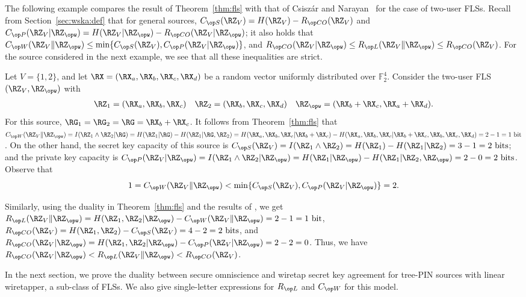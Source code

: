 The following example compares the result of Theorem~\ref{thm:fls} with that of Csisz\'ar and Narayan~\cite{csiszar04} for the case of  two-user FLSs. Recall from Section~\ref{sec:wska:def} that for general sources, $\skc(\RZ_V) = H(\RZ_V) - \rco(\RZ_V)$ and $\pkc(\RZ_V | \RZ_{\opw}) = H(\RZ_V|\RZ_{\opw}) - \rco(\RZ_V|\RZ_{\opw})$; it also holds that $\wskc(\RZ_V \| \RZ_{\opw}) \leq \min\{\skc(\RZ_V),\pkc(\RZ_V | \RZ_{\opw})\}$, and $\rco(\RZ_V|\RZ_{\opw})\leq \rl(\RZ_V \| \RZ_{\opw}) \leq \rco(\RZ_V)$. For the source considered in the next example, we see that all these inequalities are strict.
\begin{example}
Let $V=\{1, 2\}$, and let $\RX= (\RX_{a}, \RX_{b}, \RX_{c}, \RX_{d})$ be a random vector uniformly distributed over $\mathbb{F}_2^4$. Consider the two-user FLS  $(\RZ_V, \RZ_{\opw})$ with
\begin{gather*}
   \RZ_1= (\RX_a, \RX_b, \RX_c)  \quad \RZ_2= (\RX_b, \RX_c, \RX_d) \quad \RZ_{\opw}= (\RX_b+\RX_c, \RX_a+\RX_d).
\end{gather*}
For this source, $\RG_1=\RG_2 = \RG=\RX_b+\RX_c$.
It follows from Theorem~\ref{thm:fls} that $\wskc(\RZ_V \| \RZ_{\opw})= I(\RZ_1 \wedge \RZ_2|\RG)= H(\RZ_1|\RG)-H(\RZ_1|\RG, \RZ_2)= H(\RX_a, \RX_b, \RX_c|\RX_b+\RX_c)-H(\RX_a, \RX_b, \RX_c|\RX_b+\RX_c, \RX_b, \RX_c, \RX_d)= 2-1= 1 \text{ bit}$. On the other hand, the secret key capacity of this source is $\skc(\RZ_V)=I(\RZ_1 \wedge \RZ_2)=H(\RZ_1)-H(\RZ_1|\RZ_2)=3-1=2 \text{ bits}$; and the private key capacity is $\pkc(\RZ_V|\RZ_{\opw})=I(\RZ_1 \wedge \RZ_2|\RZ_{\opw})=H(\RZ_1|\RZ_{\opw})-H(\RZ_1|\RZ_2,\RZ_{\opw})=2-0=2 \text{ bits}$. Observe that $$1=\wskc(\RZ_V \| \RZ_{\opw})< \min \{\skc(\RZ_V), \pkc(\RZ_V|\RZ_{\opw})\}=2.$$

Similarly, using the duality in Theorem~\ref{thm:fls} and the results of \cite{csiszar04}, we get $\rl (\RZ_V\|\RZ_{\opw})= H(\RZ_1,\RZ_2|\RZ_{\opw}) - \wskc(\RZ_V\|\RZ_{\opw})=2-1=1\text{ bit}$, $\rco(\RZ_V) = H(\RZ_1,\RZ_2) - \skc(\RZ_V)=4-2=2\text{ bits}$, and $\rco(\RZ_V|\RZ_{\opw}) = H(\RZ_1,\RZ_2|\RZ_{\opw}) - \pkc(\RZ_V|\RZ_{\opw}) = 2-2 =0 $. Thus, we have $\rco(\RZ_V|\RZ_{\opw})< \rl(\RZ_V\|\RZ_{\opw}) < \rco(\RZ_V)$.


\end{example}

In the next section, we prove the duality between secure omniscience and wiretap secret key agreement for tree-PIN sources with linear wiretapper, a sub-class of FLSs. We also give single-letter expressions for $\rl$ and $\wskc$ for this model.
